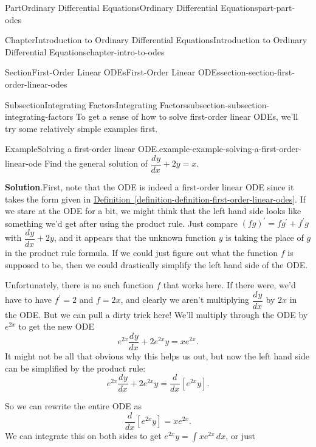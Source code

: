 \documentclass[twoside,10pt,]{book}
\newcommand{\blocktitlefont}{\relax}
\newcommand{\xreffont}{\relax}
\numberwithin{equation}{part}
\newcommand{\dv}[3][]{\dfrac{d^{#1} #2}{d #3^{#1}}}
\begin{document}
\begin{partptx}{Part}{Ordinary Differential Equations}{}{Ordinary Differential Equations}{}{}{part-part-odes}
\begin{chapterptx}{Chapter}{Introduction to Ordinary Differential Equations}{}{Introduction to Ordinary Differential Equations}{}{}{chapter-intro-to-odes}
\begin{sectionptx}{Section}{First-Order Linear ODEs}{}{First-Order Linear ODEs}{}{}{section-section-first-order-linear-odes}
\begin{introduction}{}
\end{introduction}%
%
%
\typeout{************************************************}
\typeout{************************************************}
%
\begin{subsectionptx}{Subsection}{Integrating Factors}{}{Integrating Factors}{}{}{subsection-subsection-integrating-factors}
To get a sense of how to solve first-order linear ODEs, we'll try some relatively simple examples first.%
\begin{example}{Example}{Solving a first-order linear ODE.}{example-example-solving-a-first-order-linear-ode}%
Find the general solution of \(\dv{y}{x}+2y = x\).%
\par\smallskip%
\noindent\textbf{\blocktitlefont Solution}.\hypertarget{solution-example-solving-a-first-order-linear-ode-c}{}\quad{}First, note that the ODE is indeed a first-order linear ODE since it takes the form given in \hyperref[definition-definition-first-order-linear-odes]{Definition~{\xreffont\ref{definition-definition-first-order-linear-odes}}}. If we stare at the ODE for a bit, we might think that the left hand side looks like something we'd get after using the product rule. Just compare \((fg)^\prime = fg^\prime +f^\prime g\) with \(\dv{y}{x}+2y\), and it appears that the unknown function \(y\) is taking the place of \(g\) in the product rule formula. If we could just figure out what the function \(f\) is supposed to be, then we could drastically simplify the left hand side of the ODE.%
\par
Unfortunately, there is no such function \(f\) that works here. If there were, we'd have to have \(f^\prime=2\) and \(f=2x\), and clearly we aren't multiplying \(\dv{y}{x}\) by \(2x\) in the ODE. But we can pull a dirty trick here! We'll multiply through the ODE by \(e^{2x}\) to get the new ODE%
\begin{equation*}
e^{2x}\dv{y}{x}+2e^{2x}y = xe^{2x}.
\end{equation*}
It might not be all that obvious why this helps us out, but now the left hand side can be simplified by the product rule:%
\begin{equation*}
e^{2x}\dv{y}{x}+2e^{2x}y = \dv{}{x}[e^{2x}y].
\end{equation*}
%
\par
So we can rewrite the entire ODE as%
\begin{equation*}
\dv{}{x}[e^{2x}y] = xe^{2x}.
\end{equation*}
We can integrate this on both sides to get \(e^{2x}y = \int xe^{2x}\,dx\), or just%

\end{example}
\end{subsectionptx}
\end{sectionptx}
\end{chapterptx}
\end{partptx}
\end{document}
